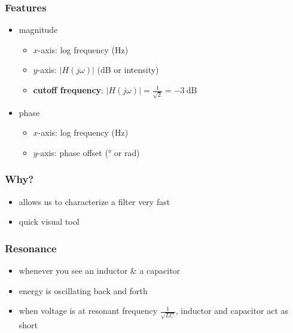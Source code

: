 \documentclass[aspectratio=169]{beamer}
\begin{document}
\begin{frame}
    \frametitle{Features}

    \begin{itemize}
        \item magnitude
        \begin{itemize}
            \item \(x\)-axis: log frequency (\si{\hertz})
            \item \(y\)-axis: \(|H(j \omega)|\) (\si{\deci\bel} or intensity)
            \item \textbf{cutoff frequency}: \(|H(j \omega)| = \frac{1}{\sqrt{2}} = \SI{-3}{\deci\bel}\)
        \end{itemize}
        \item phase
        \begin{itemize}
            \item \(x\)-axis: log frequency (\si{\hertz})
            \item \(y\)-axis: phase offset (\si{\degree} or \si{\radian})
        \end{itemize}
    \end{itemize}
\end{frame}

\begin{frame}
    \frametitle{Why?}

    \begin{itemize}
        \item allows us to characterize a filter very fast
        \item quick visual tool
    \end{itemize}
\end{frame}

\begin{frame}
    \frametitle{Resonance}

    \begin{itemize}
        \item whenever you see an inductor \& a capacitor
        \item energy is oscillating back and forth
        \item when voltage is at resonant frequency \(\frac{1}{\sqrt{LC}}\), inductor and capacitor act as short
    \end{itemize}
\end{frame}
\end{document}
